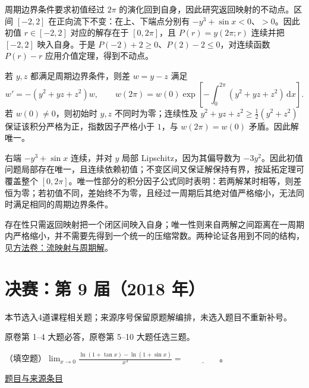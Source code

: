 \documentclass[UTF8,12pt,a4paper,fontset=fandol]{ctexart}
\begin{document}
\begin{solve}\label{ans:fin08-lo:9}

周期边界条件要求初值经过 $2\pi$ 的演化回到自身，因此研究返回映射的不动点。区间 $[-2,2]$ 在正向流下不变：在上、下端点分别有 $-y^3+\sin x<0$、$>0$。因此初值 $r\in[-2,2]$ 对应的解存在于 $[0,2\pi]$，且 $P(r)=y(2\pi;r)$ 连续并把 $[-2,2]$ 映入自身。于是 $P(-2)+2\geq0$、$P(2)-2\leq0$，对连续函数 $P(r)-r$ 应用介值定理，得到不动点。

若 $y,z$ 都满足周期边界条件，则差 $w=y-z$ 满足
\[
w'=-(y^2+yz+z^2)w,\qquad
w(2\pi)=w(0)\exp\left[-\int_0^{2\pi}(y^2+yz+z^2)\,\mathrm dx\right].
\]
若 $w(0)\ne0$，则初始时 $y,z$ 不同时为零；连续性及 $y^2+yz+z^2\geq\frac12(y^2+z^2)$ 保证该积分严格为正，指数因子严格小于 $1$，与 $w(2\pi)=w(0)$ 矛盾。因此解唯一。

右端 $-y^3+\sin x$ 连续，并对 $y$ 局部 Lipschitz，因为其偏导数为 $-3y^2$。因此初值问题局部存在唯一，且连续依赖初值；不变区间又保证解保持有界，按延拓定理可覆盖整个 $[0,2\pi]$。唯一性部分的积分因子公式同时表明：若两解某时相等，则差恒为零；若初值不同，差始终不为零，且经过一周期后其绝对值严格缩小，无法同时满足相同的周期边界条件。

\end{solve}

\begin{remark}[方法与条件]存在性只需返回映射把一个闭区间映入自身；唯一性则来自两解之间距离在一周期内严格缩小，并不需要先得到一个统一的压缩常数。两种论证各用到不同的结构，见\hyperref[app:dynamics-flow]{方法卷：流映射与周期解}。\end{remark}

\section{决赛：第 9 届（2018 年）}

本节选入4道课程相关题；来源序号保留原题解编排，未选入题目不重新补号。

\begin{remark}[来源说明]原卷第 1--4 大题必答，原卷第 5--10 大题任选三题。\end{remark}

\begin{example}[来源序号2]\label{ex:fin09-hi:2}\label{pr:fin09-hi:2}

（填空题）$\lim_{x \to 0} \frac{\ln(1+\tan x)-\ln(1+\sin x)}{x^{3}}=$ $\underline{\qquad\qquad}$。

\par\href{https://github.com/lzxcr/cmc-mathematics/blob/64916fa1fdbc3e444a652eca204d5669058ee321/src/problems/finals/09/02.md}{题目与来源条目}

\end{example}
\end{document}

